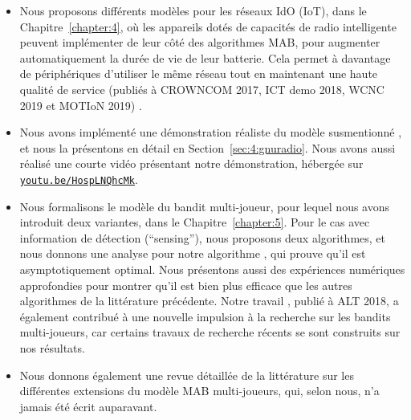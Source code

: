 \begin{resume_fr}
\begin{itemize}
    \item
    Nous proposons différents modèles pour les réseaux IdO (IoT), dans le Chapitre~\ref{chapter:4}, où les appareils dotés de capacités de radio intelligente peuvent implémenter de leur côté des algorithmes MAB, pour augmenter automatiquement la durée de vie de leur batterie. Cela permet à davantage de périphériques d'utiliser le même réseau tout en maintenant une haute qualité de service
    (publiés à CROWNCOM 2017, ICT demo 2018, WCNC 2019 et MOTIoN 2019)
    \cite{Bonnefoi17,Besson2018ICT,Besson2019WCNC,Bonnefoi2019WCNC}.

    \item
    Nous avons implémenté une démonstration réaliste du modèle susmentionné \cite{Besson2018ICT,Besson2019WCNC}, et nous la présentons en détail en Section~\ref{sec:4:gnuradio}. Nous avons aussi réalisé une courte vidéo présentant notre démonstration, hébergée sur \texttt{\href{https://youtu.be/HospLNQhcMk}{youtu.be/HospLNQhcMk}}.


    \item
    Nous formalisons le modèle du bandit multi-joueur, pour lequel nous avons introduit deux variantes, dans le Chapitre~\ref{chapter:5}.
    Pour le cas avec information de détection (``sensing''), nous proposons deux algorithmes, et nous donnons une analyse pour notre algorithme \MCTopM, qui prouve qu'il est asymptotiquement optimal.
    Nous présentons aussi des expériences numériques approfondies pour montrer qu'il est bien plus efficace que les autres algorithmes de la littérature précédente.
    Notre travail \cite{Besson2018ALT}, publié à ALT 2018, a également contribué à une nouvelle impulsion à la recherche sur les bandits multi-joueurs, car certains travaux de recherche récents se sont construits sur nos résultats.

    \item
    Nous donnons également une revue détaillée de la littérature sur les différentes extensions du modèle MAB multi-joueurs, qui, selon nous, n'a jamais été écrit auparavant.


\end{itemize}
\end{resume_fr}
